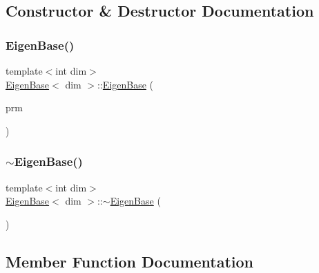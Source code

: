 \subsection{Constructor \& Destructor Documentation}
\mbox{\label{class_eigen_base_a041823ed11437980ff73ada87a9717fe}} 
\subsubsection{\texorpdfstring{Eigen\+Base()}{EigenBase()}}
{\footnotesize\ttfamily template$<$int dim$>$ \\
\hyperlink{class_eigen_base}{Eigen\+Base}$<$ dim $>$\+::\hyperlink{class_eigen_base}{Eigen\+Base} (\begin{DoxyParamCaption}\item[{const Parameter\+Handler \&}]{prm }\end{DoxyParamCaption})}

\mbox{\label{class_eigen_base_afe9efbe26f3d5a427caa1d5022555038}} 
\subsubsection{\texorpdfstring{$\sim$\+Eigen\+Base()}{~EigenBase()}}
{\footnotesize\ttfamily template$<$int dim$>$ \\
\hyperlink{class_eigen_base}{Eigen\+Base}$<$ dim $>$\+::$\sim$\hyperlink{class_eigen_base}{Eigen\+Base} (\begin{DoxyParamCaption}{ }\end{DoxyParamCaption})\hspace{0.3cm}{\ttfamily [virtual]}}



\subsection{Member Function Documentation}
\mbox{\label{class_eigen_base_a325ceda011337e2416cef726bbd5d28f}} 
